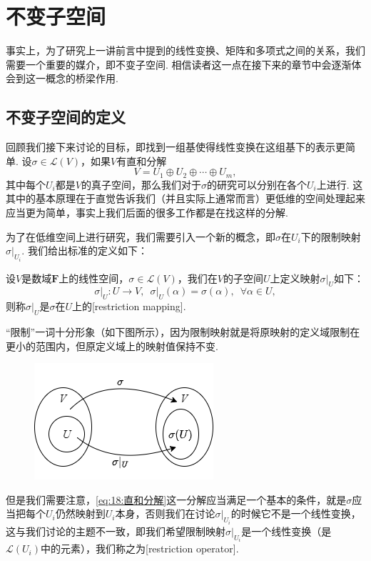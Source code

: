 \chapter{不变子空间}

事实上，为了研究上一讲前言中提到的线性变换、矩阵和多项式之间的关系，我们需要一个重要的媒介，即不变子空间. 相信读者这一点在接下来的章节中会逐渐体会到这一概念的桥梁作用.

\section{不变子空间的定义}

回顾我们接下来讨论的目标，即找到一组基使得线性变换在这组基下的表示更简单. 设$\sigma\in\mathcal{L}(V)$，如果$V$有直和分解
\begin{equation}\label{eq:18:直和分解}
    V=U_1\oplus U_2\oplus\cdots\oplus U_m,
\end{equation}
其中每个$U_i$都是$V$的真子空间，那么我们对于$\sigma$的研究可以分别在各个$U_i$上进行. 这其中的基本原理在于直觉告诉我们（并且实际上通常而言）更低维的空间处理起来应当更为简单，事实上我们后面的很多工作都是在找这样的分解.

为了在低维空间上进行研究，我们需要引入一个新的概念，即$\sigma$在$U_i$下的限制映射$\sigma\vert_{U_i}$. 我们给出标准的定义如下：
\begin{definition}
    设$V$是数域$\mathbf{F}$上的线性空间，$\sigma\in\mathcal{L}(V)$，我们在$V$的子空间$U$上定义映射$\sigma\vert_U$如下：
    \[\sigma\vert_U:U\to V,\enspace\sigma\vert_U(\alpha)=\sigma(\alpha),\enspace\forall \alpha\in U,\]
    则称$\sigma\vert_U$是$\sigma$在$U$上的[restriction mapping].
\end{definition}

``限制''一词十分形象（如下图所示），因为限制映射就是将原映射的定义域限制在更小的范围内，但原定义域上的映射值保持不变.
\begin{figure}[htbp]
    \centering
    \includegraphics[scale=0.7]{figs/18-1.png}
\end{figure}

但是我们需要注意，\autoref{eq:18:直和分解}这一分解应当满足一个基本的条件，就是$\sigma$应当把每个$U_i$仍然映射到$U_i$本身，否则我们在讨论$\sigma\vert_{U_i}$的时候它不是一个线性变换，这与我们讨论的主题不一致，即我们希望限制映射$\sigma\vert_{U_i}$是一个线性变换（是$\mathcal{L}(U_i)$中的元素），我们称之为[restriction operator].

